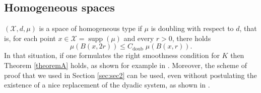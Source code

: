 \documentclass[12pt]{amsart}
\newcommand{\supp}[1]{\operatorname{supp}\left(#1\right) }
\theoremstyle{plain}
\theoremstyle{definition} %
\numberwithin{equation}{section}
\begin{document}
\subsection{Homogeneous spaces} $(\mathcal{X},d,\mu)$ is a space of homogeneous type if $\mu$ is doubling with respect to $d$, that is, for each point $x\in\mathcal{X}=\supp{\mu}$ and every $r >0$, there holds
\begin{equation}\label{eq:doub}
\mu(B(x,2r)) \leq C_{\mathrm{doub}} \; \mu(B(x,r)).  
\end{equation}
In that situation, if one formulates the right smoothness condition for $K$ then Theorem \ref{theoremA} holds, as shown for example in \cite{Lo2021}. Moreover, the scheme of proof that we used in Section \ref{sec:sec2} can be used, even without postulating the existence of a nice replacement of the dyadic system, as shown in \cite{CADPPV2022}.
\end{document}
